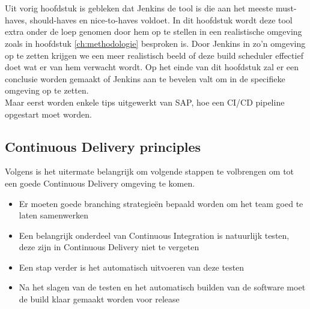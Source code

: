 
\chapter{}
\label{ch:proof-of-concept}
Uit vorig hoofdstuk is gebleken dat Jenkins de tool is die aan het meeste must-haves, should-haves en nice-to-haves voldoet. In dit hoofdstuk wordt deze tool extra onder de loep genomen door hem op te stellen in een realistische omgeving zoals in hoofdstuk \ref{ch:methodologie} besproken is. Door Jenkins in zo'n omgeving op te zetten krijgen we een meer realistisch beeld of deze build scheduler effectief doet wat er van hem verwacht wordt. Op het einde van dit hoofdstuk zal er een conclusie worden gemaakt of Jenkins aan te bevelen valt om in de specifieke omgeving op te zetten.\\
Maar eerst worden enkele tips uitgewerkt van SAP, hoe een CI/CD pipeline opgestart moet worden.

\section{Continuous Delivery principles}
\label{sec:continuous-delivery-principles}
Volgens \textcite{Riti2018} is het uitermate belangrijk om volgende stappen te volbrengen om tot een goede Continuous Delivery omgeving te komen.
\begin{itemize}
    \item Er moeten goede branching strategieën bepaald worden om het team goed te laten samenwerken
    \item Een belangrijk onderdeel van Continuous Integration is natuurlijk testen, deze zijn in Continuous Delivery niet te vergeten
    \item Een stap verder is het automatisch uitvoeren van deze testen
    \item Na het slagen van de testen en het automatisch builden van de software moet de build klaar gemaakt worden voor release
\end{itemize}

